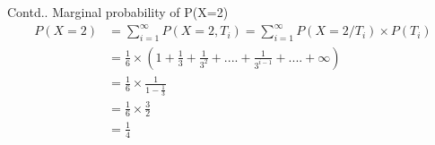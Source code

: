 \documentclass[10pt]{beamer}
\begin{document}
\begin{frame}{Contd..}
Marginal probability of P(X=2)
\begin{align*}
    P(X=2) &= \sum_{i=1}^\infty P(X=2,T_i) = \sum_{i=1}^\infty  P(X=2/T_i) \times P(T_i) \\
       &= \frac{1}{6} \times (1+\frac{1}{3}+\frac{1}{3^2} + ....+\frac{1}{3^{i-1}} + .... + \infty)\\
        &= \frac{1}{6} \times \frac{1}{1-\frac{1}{3}}\\
        &= \frac{1}{6} \times \frac{3}{2} \\
        &= \frac{1}{4}
\end{align*}
\end{frame}
\end{document}

